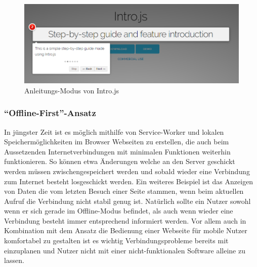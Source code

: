  \begin{figure}
    \centering
    \captionsetup{justification=centering}
    \includegraphics[width=\textwidth]{figures/intro_js_example.png}
        \caption{Anleitungs-Modus von Intro.js}
        \label{fig:intro_js_example}
\end{figure}

\subsubsection{``Offline-First''-Ansatz}
In jüngster Zeit ist es möglich mithilfe von Service-Worker  und lokalen Speichermöglichkeiten im Browser Webseiten zu erstellen, die auch beim Aussetzenden Internetverbindungen mit minimalen Funktionen weiterhin funktionieren. So können etwa Änderungen welche an den Server geschickt werden müssen zwischengespeichert werden und sobald wieder eine Verbindung zum Internet besteht losgeschickt werden. Ein weiteres Beispiel ist das Anzeigen von Daten die vom letzten Besuch einer Seite stammen, wenn beim aktuellen Aufruf die Verbindung nicht stabil genug ist. Natürlich sollte ein Nutzer sowohl wenn er sich gerade im Offline-Modus befindet, als auch wenn wieder eine Verbindung besteht immer entsprechend informiert werden.
Vor allem auch in Kombination mit dem Ansatz die Bedienung einer Webseite für mobile Nutzer komfortabel zu gestalten ist es wichtig Verbindungsprobleme bereits mit einzuplanen und Nutzer nicht mit einer nicht-funktionalen Software alleine zu lassen.

